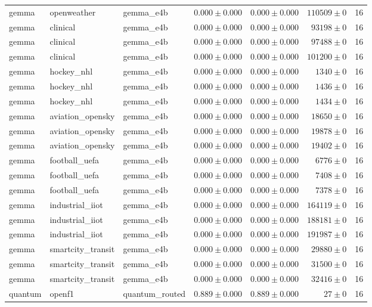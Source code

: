 \begin{table}[htbp]
\begin{tabular}{l l l r r r r}
gemma & openweather & gemma\_e4b & $0.000\pm0.000$ & $0.000\pm0.000$ & $110509\pm0$ & 16 \\
gemma & clinical & gemma\_e4b & $0.000\pm0.000$ & $0.000\pm0.000$ & $93198\pm0$ & 16 \\
gemma & clinical & gemma\_e4b & $0.000\pm0.000$ & $0.000\pm0.000$ & $97488\pm0$ & 16 \\
gemma & clinical & gemma\_e4b & $0.000\pm0.000$ & $0.000\pm0.000$ & $101200\pm0$ & 16 \\
gemma & hockey\_nhl & gemma\_e4b & $0.000\pm0.000$ & $0.000\pm0.000$ & $1340\pm0$ & 16 \\
gemma & hockey\_nhl & gemma\_e4b & $0.000\pm0.000$ & $0.000\pm0.000$ & $1436\pm0$ & 16 \\
gemma & hockey\_nhl & gemma\_e4b & $0.000\pm0.000$ & $0.000\pm0.000$ & $1434\pm0$ & 16 \\
gemma & aviation\_opensky & gemma\_e4b & $0.000\pm0.000$ & $0.000\pm0.000$ & $18650\pm0$ & 16 \\
gemma & aviation\_opensky & gemma\_e4b & $0.000\pm0.000$ & $0.000\pm0.000$ & $19878\pm0$ & 16 \\
gemma & aviation\_opensky & gemma\_e4b & $0.000\pm0.000$ & $0.000\pm0.000$ & $19402\pm0$ & 16 \\
gemma & football\_uefa & gemma\_e4b & $0.000\pm0.000$ & $0.000\pm0.000$ & $6776\pm0$ & 16 \\
gemma & football\_uefa & gemma\_e4b & $0.000\pm0.000$ & $0.000\pm0.000$ & $7408\pm0$ & 16 \\
gemma & football\_uefa & gemma\_e4b & $0.000\pm0.000$ & $0.000\pm0.000$ & $7378\pm0$ & 16 \\
gemma & industrial\_iiot & gemma\_e4b & $0.000\pm0.000$ & $0.000\pm0.000$ & $164119\pm0$ & 16 \\
gemma & industrial\_iiot & gemma\_e4b & $0.000\pm0.000$ & $0.000\pm0.000$ & $188181\pm0$ & 16 \\
gemma & industrial\_iiot & gemma\_e4b & $0.000\pm0.000$ & $0.000\pm0.000$ & $191987\pm0$ & 16 \\
gemma & smartcity\_transit & gemma\_e4b & $0.000\pm0.000$ & $0.000\pm0.000$ & $29880\pm0$ & 16 \\
gemma & smartcity\_transit & gemma\_e4b & $0.000\pm0.000$ & $0.000\pm0.000$ & $31500\pm0$ & 16 \\
gemma & smartcity\_transit & gemma\_e4b & $0.000\pm0.000$ & $0.000\pm0.000$ & $32416\pm0$ & 16 \\
quantum & openf1 & quantum\_routed & $0.889\pm0.000$ & $0.889\pm0.000$ & $27\pm0$ & 16 \\

\end{tabular}
\end{table}
